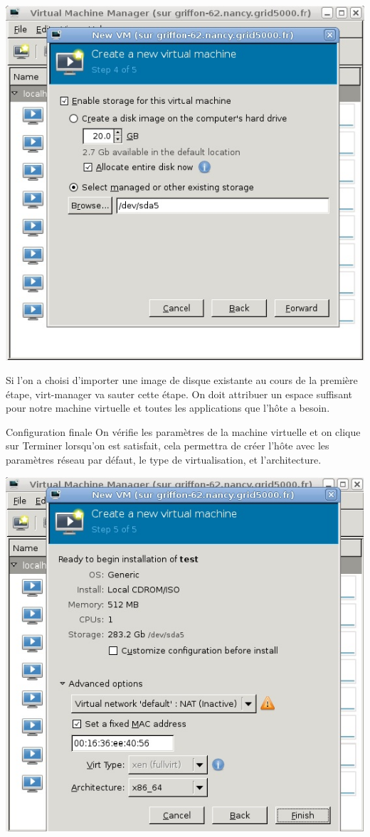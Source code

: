 \includegraphics{images/Storage.jpg}

 Si l'on a choisi d'importer une image de disque existante au cours de la première étape, virt-manager va sauter cette étape.
On doit attribuer un espace suffisant pour notre machine virtuelle et toutes les applications que l'hôte a besoin.

Configuration finale
On vérifie les paramètres de la machine virtuelle et on clique sur Terminer lorsqu'on est satisfait, cela permettra de créer l'hôte avec les paramètres réseau par défaut, le type de virtualisation, et l'architecture.

\includegraphics{images/reseau.jpg}
